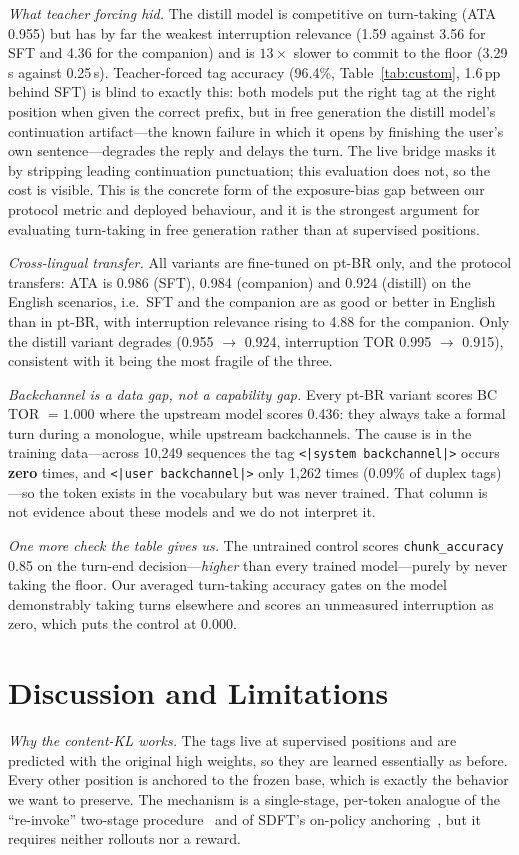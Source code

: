 \documentclass[conference]{IEEEtran}
\begin{document}
\emph{What teacher forcing hid.} The distill model is competitive on turn-taking
(ATA 0.955) but has by far the weakest interruption relevance (1.59 against 3.56
for SFT and 4.36 for the companion) and is $13\times$ slower to commit to the floor
(3.29\,s against 0.25\,s). Teacher-forced tag accuracy (96.4\%, Table~\ref{tab:custom},
1.6\,pp behind SFT) is blind to exactly this: both models put the right tag at the
right position when given the correct prefix, but in free generation the distill
model's continuation artifact---the known failure in which it opens by finishing
the user's own sentence---degrades the reply and delays the turn. The live bridge
masks it by stripping leading continuation punctuation; this evaluation does not,
so the cost is visible. This is the concrete form of the exposure-bias gap between
our protocol metric and deployed behaviour, and it is the strongest argument for
evaluating turn-taking in free generation rather than at supervised positions.

\emph{Cross-lingual transfer.} All variants are fine-tuned on pt-BR only, and the
protocol transfers: ATA is 0.986 (SFT), 0.984 (companion) and 0.924 (distill) on
the English scenarios, i.e.\ SFT and the companion are as good or better in English
than in pt-BR, with interruption relevance rising to 4.88 for the companion. Only
the distill variant degrades (0.955 $\rightarrow$ 0.924, interruption TOR
0.995 $\rightarrow$ 0.915), consistent with it being the most fragile of the three.

\emph{Backchannel is a data gap, not a capability gap.} Every pt-BR variant scores
BC TOR $=1.000$ where the upstream model scores 0.436: they always take a formal
turn during a monologue, while upstream backchannels. The cause is in the training
data---across 10{,}249 sequences the tag \texttt{<|system backchannel|>} occurs
\textbf{zero} times, and \texttt{<|user backchannel|>} only 1{,}262 times (0.09\% of
duplex tags)---so the token exists in the vocabulary but was never trained. That
column is not evidence about these models and we do not interpret it.

\emph{One more check the table gives us.} The untrained control scores
\texttt{chunk\_accuracy} 0.85 on the turn-end decision---\emph{higher} than every
trained model---purely by never taking the floor. Our averaged turn-taking accuracy
gates on the model demonstrably taking turns elsewhere and scores an unmeasured
interruption as zero, which puts the control at 0.000.

\section{Discussion and Limitations}
\label{sec:discussion}
\emph{Why the content-KL works.} The tags live at supervised positions and are
predicted with the original high weights, so they are learned essentially as before.
Every other position is anchored to the frozen base, which is exactly the behavior
we want to preserve. The mechanism is a single-stage, per-token analogue of the
``re-invoke'' two-stage procedure~\cite{tml2025} and of SDFT's on-policy
anchoring~\cite{selfdistill2026}, but it requires neither rollouts nor a reward.
\end{document}
